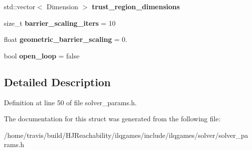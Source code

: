 \begin{DoxyCompactItemize}
\item 
std\+::vector$<$ Dimension $>$ {\bfseries trust\+\_\+region\+\_\+dimensions}\hypertarget{structilqgames_1_1_solver_params_a5d2025c32b094329c126777e53122a08}{}\label{structilqgames_1_1_solver_params_a5d2025c32b094329c126777e53122a08}

\item 
size\+\_\+t {\bfseries barrier\+\_\+scaling\+\_\+iters} = 10\hypertarget{structilqgames_1_1_solver_params_a0759cbca5370ac06afb2ed3b460ee233}{}\label{structilqgames_1_1_solver_params_a0759cbca5370ac06afb2ed3b460ee233}

\item 
float {\bfseries geometric\+\_\+barrier\+\_\+scaling} = 0.\hypertarget{structilqgames_1_1_solver_params_afe514e86e3439b0b041ce0fda74338bd}{}\label{structilqgames_1_1_solver_params_afe514e86e3439b0b041ce0fda74338bd}

\item 
bool {\bfseries open\+\_\+loop} = false\hypertarget{structilqgames_1_1_solver_params_abb3fe1fbe358304f0c80d75c104bc087}{}\label{structilqgames_1_1_solver_params_abb3fe1fbe358304f0c80d75c104bc087}

\end{DoxyCompactItemize}


\subsection{Detailed Description}


Definition at line 50 of file solver\+\_\+params.\+h.



The documentation for this struct was generated from the following file\+:\begin{DoxyCompactItemize}
\item 
/home/travis/build/\+H\+J\+Reachability/ilqgames/include/ilqgames/solver/solver\+\_\+params.\+h\end{DoxyCompactItemize}
